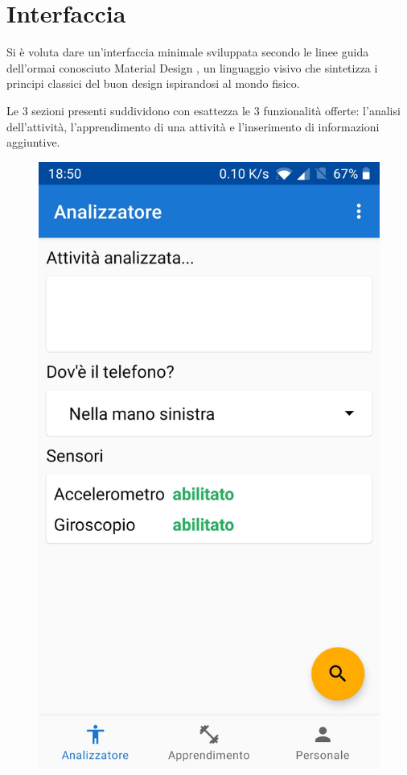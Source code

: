 \section{Interfaccia}
Si è voluta dare un'interfaccia minimale sviluppata secondo le linee guida dell'ormai conosciuto Material Design \cite{material}, un 
linguaggio visivo che sintetizza i principi classici del buon design ispirandosi al mondo fisico.

Le 3 sezioni presenti suddividono con esattezza le 3 funzionalità offerte: 
l'analisi dell'attività, l'apprendimento di una attività e l'inserimento di informazioni aggiuntive.
\begin{figure}[H]
    \centering
    \includegraphics[scale = 0.10]{assets/images/screenshots/1a_Init.jpg}

\end{figure}
